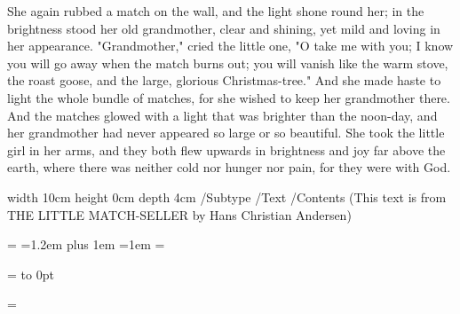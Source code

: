 {    She again rubbed a match on the wall, and the light shone round
her; in the brightness stood her old grandmother, clear and shining,
yet mild and loving in her appearance. "Grandmother," cried the little
one, "O take me with you; I know you will go away when the match burns
out; you will vanish like the warm stove, the roast goose, and the
large, glorious Christmas-tree." And she made haste to light the whole
bundle of matches, for she wished to keep her grandmother there. And
the matches glowed with a light that was brighter than the noon-day,
and her grandmother had never appeared so large or so beautiful. She
took the little girl in her arms, and they both flew upwards in
brightness and joy far above the earth, where there was neither cold
nor hunger nor pain, for they were with God.
}

\pdfannot               %
    width 10cm          %
    height 0cm          %
    depth  4cm          %
{                       %
    /Subtype /Text      %
    /Contents           %
        (This text is from THE LITTLE MATCH-SELLER by Hans Christian
         Andersen)
}

\def\colsep{\qquad}          %
=\vbox{%
    \baselineskip=1.2em
    \hsize=2in 
    \rightskip=0pt plus 1em 
    \hfuzz=1em
    \parskip=\baselineskip
    \null                   %
    \text}

= to 0pt    %

=             %

